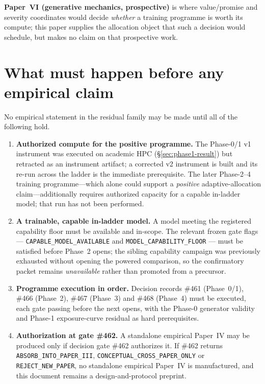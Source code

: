 \documentclass[11pt]{article}
\newcommand{\code}[1]{\texttt{#1}}
\begin{document}
\textbf{Paper~VI (generative mechanics, prospective)} is where value/promise and severity coordinates would decide \emph{whether} a training programme is worth its compute; this paper supplies the allocation object that such a decision would schedule, but makes no claim on that prospective work.

\section{What must happen before any empirical claim}
\label{sec:preconditions}

No empirical statement in the residual family may be made until all of the following hold.

\begin{enumerate}[leftmargin=1.5em,itemsep=2pt]
\item \textbf{Authorized compute for the positive programme.} The Phase-0/1 v1 instrument was executed on academic HPC (\S\ref{sec:phase1-result}) but retracted as an instrument artifact; a corrected v2 instrument is built and its re-run across the ladder is the immediate prerequisite. The later Phase-2--4 training programme---which alone could support a \emph{positive} adaptive-allocation claim---additionally requires authorized capacity for a capable in-ladder model; that run has not been performed.
\item \textbf{A trainable, capable in-ladder model.} A model meeting the registered capability floor must be available and in-scope. The relevant frozen gate flags --- \texttt{CAPABLE\_MODEL\_AVAILABLE} and \texttt{MODEL\_CAPABILITY\_FLOOR} --- must be satisfied before Phase~2 opens; the sibling capability campaign was previously exhausted without opening the powered comparison, so the confirmatory packet remains \emph{unavailable} rather than promoted from a precursor.
\item \textbf{Programme execution in order.} Decision records \#461 (Phase~0/1), \#466 (Phase~2), \#467 (Phase~3) and \#468 (Phase~4) must be executed, each gate passing before the next opens, with the Phase-0 generator validity and Phase-1 exposure-curve residual as hard prerequisites.
\item \textbf{Authorization at gate \#462.} A standalone empirical Paper~IV may be produced only if decision gate \#462 authorizes it. If \#462 returns \code{ABSORB\_INTO\_PAPER\_III}, \code{CONCEPTUAL\_CROSS\_PAPER\_ONLY} or \code{REJECT\_NEW\_PAPER}, no standalone empirical Paper~IV is manufactured, and this document remains a design-and-protocol preprint.
\end{enumerate}
\end{document}
